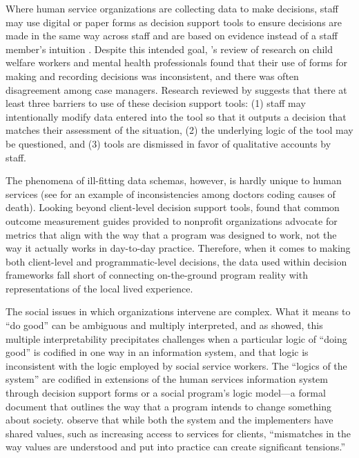 Where human service organizations are collecting data to make decisions, staff may use digital or paper forms as decision support tools to ensure decisions are made in the same way across staff and are based on evidence instead of a staff member’s intuition \citep{Schwalbe2004HS}. Despite this intended goal, \cite{Schwalbe2004HS}'s review of research on child welfare workers and mental health professionals found that their use of forms for making and recording decisions was inconsistent, and there was often disagreement among case managers. Research reviewed by \cite{Schwalbe2004HS} suggests that there at least three barriers to use of these decision support tools: (1) staff may intentionally modify data entered into the tool so that it outputs a decision that matches their assessment of the situation, (2) the underlying logic of the tool may be questioned, and (3) tools are dismissed in favor of qualitative accounts by staff.

The phenomena of ill-fitting data schemas, however, is hardly unique to human services (see \cite{Bowker2000Sorting} for an example of inconsistencies among doctors coding causes of death). Looking beyond client-level decision support tools, \cite{Benjamin2012FrontOut} found that common outcome measurement guides provided to nonprofit organizations advocate for metrics that align with the way that a program was designed to work, not the way it actually works in day-to-day practice. Therefore, when it comes to making both client-level and programmatic-level decisions, the data used within decision frameworks fall short of connecting on-the-ground program reality with representations of the local lived experience.

The social issues in which organizations intervene are complex. What it means to “do good” can be ambiguous and multiply interpreted, and as \cite{Voida2014SharedValues} showed, this multiple interpretability precipitates challenges when a particular logic of “doing good” is codified in one way in an information system, and that logic is inconsistent with the logic employed by social service workers. The “logics of the system” \citep{Voida2014SharedValues} are codified in extensions of the human services information system through decision support forms or a social program’s logic model---a formal document that outlines the way that a program intends to change something about society. \cite{Voida2014SharedValues} observe that while both the system and the implementers have shared values, such as increasing access to services for clients, “mismatches in the way values are understood and put into practice can create significant tensions.”

